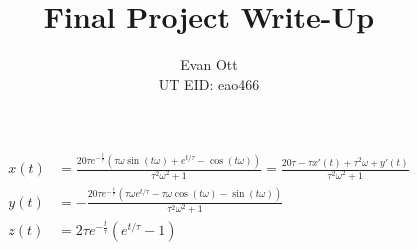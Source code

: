 \documentclass{article}
\title{\vspace{-6ex}Final Project Write-Up\vspace{-2ex}}
\author{Evan Ott \\ UT EID: eao466\vspace{-2ex}}
\begin{document}
\maketitle

\begin{align*}
x(t)&=\frac{20 \tau  e^{-\frac{t}{\tau }} \left(\tau  \omega  \sin (t \omega )+e^{t/\tau }-\cos (t \omega )\right)}{\tau ^2 \omega ^2+1} = \frac{20\tau-\tau x'(t) + \tau^2 \omega + y'(t)}{\tau ^2 \omega ^2+1}\\
y(t)&=-\frac{20 \tau  e^{-\frac{t}{\tau }} \left(\tau  \omega  e^{t/\tau }-\tau  \omega  \cos (t \omega )-\sin (t \omega )\right)}{\tau ^2 \omega ^2+1}\\
z(t)&=2 \tau  e^{-\frac{t}{\tau }} \left(e^{t/\tau }-1\right)
\end{align*}

%
%

\end{document}
